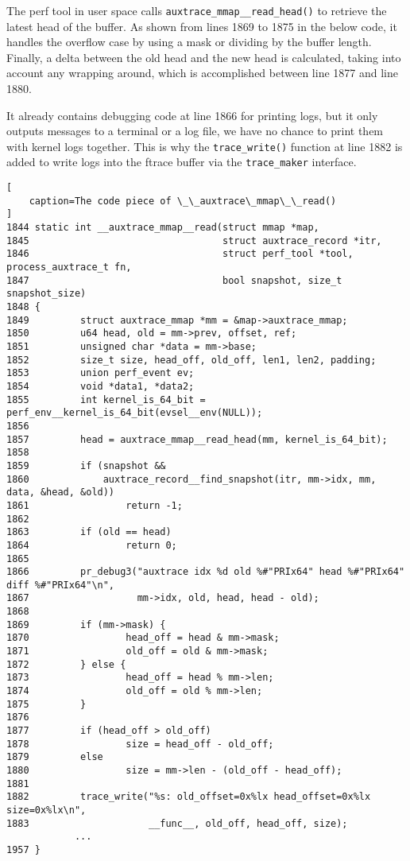 \documentclass[11pt]{diazessay} %
\def\code#1{\texttt{#1}}
\begin{document}
The perf tool in user space calls \code{auxtrace\_mmap\_\_read\_head()} to
retrieve the latest head of the buffer. As shown from lines 1869 to 1875 in
the below code, it handles the overflow case by using a mask or dividing by
the buffer length. Finally, a delta between the old head and the new head is
calculated, taking into account any wrapping around, which is accomplished
between line 1877 and line 1880.

It already contains debugging code at line 1866 for printing logs, but it
only outputs messages to a terminal or a log file, we have no chance to print
them with kernel logs together.  This is why the \code{trace\_write()}
function at line 1882 is added to write logs into the ftrace buffer via the
\code{trace\_maker} interface.

\begin{lstlisting}[
	caption=The code piece of \_\_auxtrace\_mmap\_\_read()
]
1844 static int __auxtrace_mmap__read(struct mmap *map,
1845                                  struct auxtrace_record *itr,
1846                                  struct perf_tool *tool, process_auxtrace_t fn,
1847                                  bool snapshot, size_t snapshot_size)
1848 {
1849         struct auxtrace_mmap *mm = &map->auxtrace_mmap;
1850         u64 head, old = mm->prev, offset, ref;
1851         unsigned char *data = mm->base;
1852         size_t size, head_off, old_off, len1, len2, padding;
1853         union perf_event ev;
1854         void *data1, *data2;
1855         int kernel_is_64_bit = perf_env__kernel_is_64_bit(evsel__env(NULL));
1856
1857         head = auxtrace_mmap__read_head(mm, kernel_is_64_bit);
1858
1859         if (snapshot &&
1860             auxtrace_record__find_snapshot(itr, mm->idx, mm, data, &head, &old))
1861                 return -1;
1862
1863         if (old == head)
1864                 return 0;
1865
1866         pr_debug3("auxtrace idx %d old %#"PRIx64" head %#"PRIx64" diff %#"PRIx64"\n",
1867                   mm->idx, old, head, head - old);
1868
1869         if (mm->mask) {
1870                 head_off = head & mm->mask;
1871                 old_off = old & mm->mask;
1872         } else {
1873                 head_off = head % mm->len;
1874                 old_off = old % mm->len;
1875         }
1876
1877         if (head_off > old_off)
1878                 size = head_off - old_off;
1879         else
1880                 size = mm->len - (old_off - head_off);
1881
1882         trace_write("%s: old_offset=0x%lx head_offset=0x%lx size=0x%lx\n",
1883                     __func__, old_off, head_off, size);
            ...
1957 }
\end{lstlisting}
\end{document}
